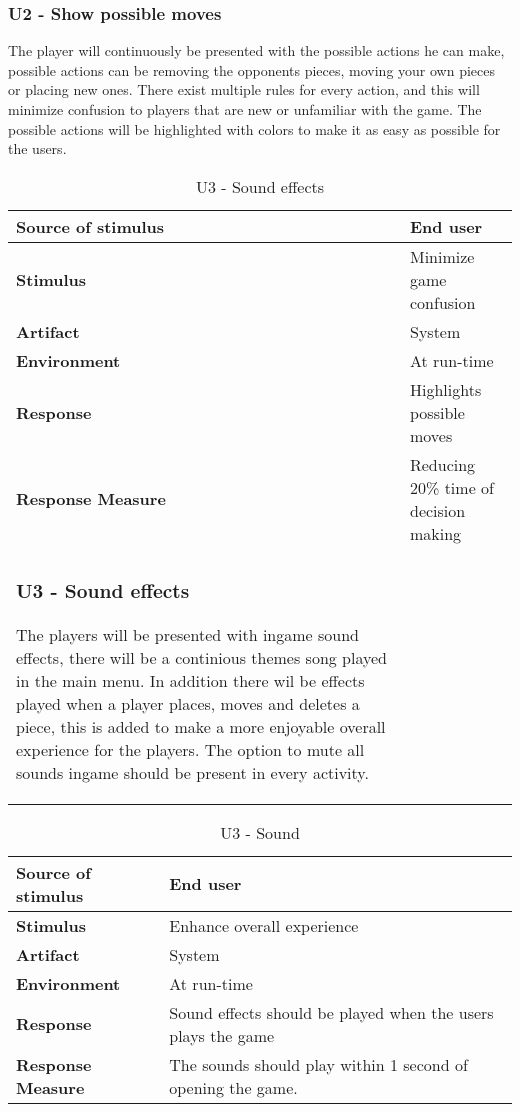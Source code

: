 \pagebreak

\subsubsection{U2 - Show possible moves}

The player will continuously be presented with the possible actions he can make, possible actions can be removing the opponents pieces, moving your own pieces or placing new ones. There exist multiple rules for every action, and this will minimize confusion to players that are new or unfamiliar with the game. The possible actions will be highlighted with colors to make it as easy as possible for the users.

\begin{table}[h!]
\begin{tabular}{ | p{110pt} | p{250pt}  |}
\hline
\bf Source of stimulus &  End user  \\ \hline
\bf Stimulus & Minimize game confusion \\ \hline 
\bf Artifact & System  \\  \hline
\bf Environment & At run-time \\ \hline
\bf Response & Highlights possible moves \\ \hline
\bf Response Measure & Reducing 20\% time of decision making   \\ \hline

\subsubsection{U3 - Sound effects}

The players will be presented with ingame sound effects, there will be a continious themes song played in the main menu. In addition there wil be effects played when a player places, moves and deletes a piece, this is added to make a more enjoyable overall experience for the players. The option to mute all sounds ingame should be present in every activity.

\end{tabular}
\caption{U3 - Sound effects}
\end{table}

\begin{table}[h!]
\begin{tabular}{ | p{110pt} | p{250pt}  |}
\hline
\bf Source of stimulus &  End user  \\ \hline
\bf Stimulus & Enhance overall experience \\ \hline 
\bf Artifact & System  \\  \hline
\bf Environment & At run-time \\ \hline
\bf Response & Sound effects should be played when the users plays the game \\ \hline
\bf Response Measure &  The sounds should play within 1 second of opening the game. \\ \hline

\end{tabular}
\caption{U3 - Sound}
\end{table}

